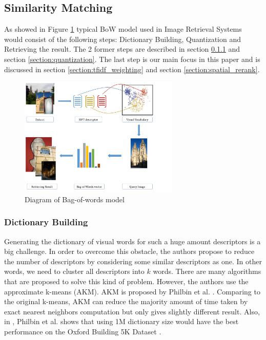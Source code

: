 \subsection{Similarity Matching} \label{section:similarity_extraction}

As showed in Figure \ref{fig:bow_model} typical BoW model used in Image Retrieval Systems would consist of the following steps: Dictionary Building, Quantization and Retrieving the result. The 2 former steps are described in section \ref{section:dictionary_building} and section \ref{section:quantization}. The last step is our main focus in this paper and is discussed in section \ref{section:tfidf_weighting} and section \ref{section:spatial_rerank}.

\begin{figure}
    \centering
    \includegraphics[width=3.0in]{process.pdf}
    \caption{Diagram of Bag-of-words model}
    \label{fig:bow_model}
\end{figure}

\subsubsection{Dictionary Building} \label{section:dictionary_building}

Generating the dictionary of visual words for such a huge amount descriptors is a big challenge. In order to overcome this obstacle, the authors propose to reduce the number of descriptors by considering some similar descriptors as one. In other words, we need to cluster all descriptors into $k$ words. There are many algorithms that are proposed to solve this kind of problem. However, the authors use the approximate k-means (AKM). AKM is proposed by Philbin et al. \cite{2}. Comparing to the original k-means, AKM can reduce the majority amount of time taken by exact nearest neighbors computation but only gives slightly different result. Also, in \cite{2}, Philbin et al. shows that using 1M dictionary size would have the best performance on the Oxford Building 5K Dataset \cite{oxbuilding}.

